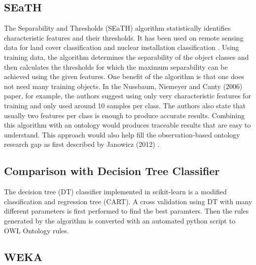 \documentclass[authoryear, review,12pt,number]{elsarticle}
\begin{document}
\subsection{SEaTH} The Separability and Thresholds (SEaTH) algorithm
\citep{Nussbaum2006} statistically identifies characteristic features and their thresholds. It has
been used on remote sensing data for land cover classification \citep{Gao2011}
and nuclear installation classification \citep{Nussbaum2006}.
Using training data, the algorithm determines the separability of the object
classes and then calculates the thresholds for which the maximum separability
can be achieved using the given features. One benefit of the algorithm is that
one does not need many training objects.
In the Nussbaum, Niemeyer and Canty (2006) paper, for example, the authors
suggest using only very characteristic features for training and only used
around 10 samples per class\citep{Nussbaum2006}. The authors also state that
usually two features per class is enough to produce accurate results. Combining
this algorithm with an ontology would produces traceable results that are easy
to understand. This approach would also help fill the observation-based ontology
research gap as first described by Janowicz (2012) \citep{Janowicz2012}.

\subsection{Comparison with Decision Tree Classifier}
The decision tree (DT) classifier implemented in scikit-learn is a modified
classification and regression tree (CART)\citep{scikit-learn}. A cross
validation using DT with many different parameters is first performed to find the best
paramters. Then the rules generated by the algorithm is converted with an
automated python script to OWL Ontology rules.

\subsection{WEKA}
\end{document}
